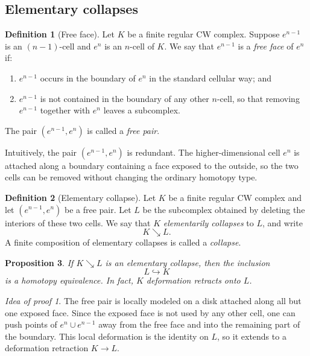 \documentclass[11pt,a4paper]{article}
\theoremstyle{definition}
\newtheorem{definition}{Definition}[section]
\theoremstyle{plain}
\newtheorem{proposition}[definition]{Proposition}
\theoremstyle{remark}
\newtheorem*{proofidea}{Idea of proof}
\begin{document}
\subsection{Elementary collapses}

\begin{definition}[Free face]
Let \(K\) be a finite regular CW complex. Suppose \(e^{n-1}\) is an \((n-1)\)-cell and \(e^n\) is an \(n\)-cell of \(K\). We say that \(e^{n-1}\) is a \emph{free face} of \(e^n\) if:
\begin{enumerate}
  \item \(e^{n-1}\) occurs in the boundary of \(e^n\) in the standard cellular way; and
  \item \(e^{n-1}\) is not contained in the boundary of any other \(n\)-cell, so that removing \(e^{n-1}\) together with \(e^n\) leaves a subcomplex.
\end{enumerate}
The pair \((e^{n-1},e^n)\) is called a \emph{free pair}.
\end{definition}

Intuitively, the pair \((e^{n-1},e^n)\) is redundant. The higher-dimensional cell \(e^n\) is attached along a boundary containing a face exposed to the outside, so the two cells can be removed without changing the ordinary homotopy type.

\begin{definition}[Elementary collapse]
Let \(K\) be a finite regular CW complex and let \((e^{n-1},e^n)\) be a free pair. Let \(L\) be the subcomplex obtained by deleting the interiors of these two cells. We say that \(K\) \emph{elementarily collapses} to \(L\), and write
\[
  K\searrow L.
\]
A finite composition of elementary collapses is called a \emph{collapse}.
\end{definition}

\begin{proposition}
If \(K\searrow L\) is an elementary collapse, then the inclusion
\[
  L\hookrightarrow K
\]
is a homotopy equivalence. In fact, \(K\) deformation retracts onto \(L\).
\end{proposition}

\begin{proofidea}
The free pair is locally modeled on a disk attached along all but one exposed face. Since the exposed face is not used by any other cell, one can push points of \(e^n\cup e^{n-1}\) away from the free face and into the remaining part of the boundary. This local deformation is the identity on \(L\), so it extends to a deformation retraction \(K\to L\).
\end{proofidea}
\end{document}
